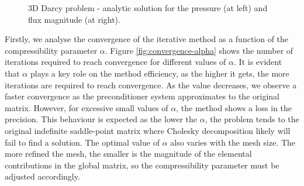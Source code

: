 \documentclass{wccm2024}
\begin{document}
\begin{figure}[!ht]
    \centering
     \hfill
    \caption{3D Darcy problem - analytic solution for the pressure (at left) and flux magnitude (at right).}
    \label{fig:analytic-solutions}
\end{figure}

Firstly, we analyse the convergence of the iterative method as a function of the compressibility parameter $\alpha$. Figure \ref{fig:convergence-alpha} shows the number of iterations required to reach convergence for different values of $\alpha$. It is evident that $\alpha$ plays a key role on the method efficiency, as the higher it gets, the more iterations are required to reach convergence. As the value decreases, we observe a faster convergence as the preconditioner system approximates to the original matrix. However, for excessive small values of $\alpha$, the method shows a loss in the precision. This behaviour is expected as the lower the $\alpha$, the problem tends to the original indefinite saddle-point matrix where Cholesky decomposition likely will fail to find a solution. The optimal value of $\alpha$ also varies with the mesh size. The more refined the mesh, the smaller is the magnitude of the elemental contributions in the global matrix, so the compressibility parameter must be adjusted accordingly.
\end{document}
